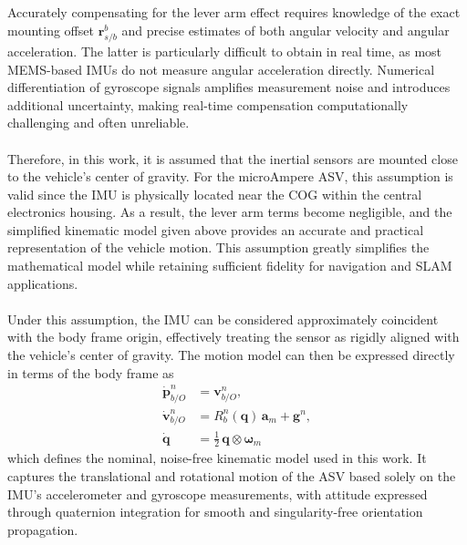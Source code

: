 \\ \\
Accurately compensating for the lever arm effect requires knowledge of the exact mounting offset $\mathbf{r}_{s/b}^{b}$ and precise estimates of both angular velocity and angular acceleration. The latter is particularly difficult to obtain in real time, as most MEMS-based IMUs do not measure angular acceleration directly. Numerical differentiation of gyroscope signals amplifies measurement noise and introduces additional uncertainty, making real-time compensation computationally challenging and often unreliable.  
\\ \\
Therefore, in this work, it is assumed that the inertial sensors are mounted close to the vehicle’s center of gravity. For the microAmpere ASV, this assumption is valid since the IMU is physically located near the COG within the central electronics housing. As a result, the lever arm terms become negligible, and the simplified kinematic model given above provides an accurate and practical representation of the vehicle motion. This assumption greatly simplifies the mathematical model while retaining sufficient fidelity for navigation and SLAM applications.  
\\ \\
Under this assumption, the IMU can be considered approximately coincident with the body frame origin, effectively treating the sensor as rigidly aligned with the vehicle’s center of gravity. The motion model can then be expressed directly in terms of the body frame as
$$
\begin{aligned}
    \dot{\mathbf{p}}_{b/O}^{n} &= \mathbf{v}_{b/O}^{n}, \\
    \dot{\mathbf{v}}_{b/O}^{n} &= R_b^n(\mathbf{q})\,\mathbf{a}_m + \mathbf{g}^n, \\
    \dot{\mathbf{q}} &= \tfrac{1}{2}\,\mathbf{q} \otimes \boldsymbol{\omega}_m
\end{aligned}
$$
which defines the nominal, noise-free kinematic model used in this work. It captures the translational and rotational motion of the ASV based solely on the IMU’s accelerometer and gyroscope measurements, with attitude expressed through quaternion integration for smooth and singularity-free orientation propagation.






